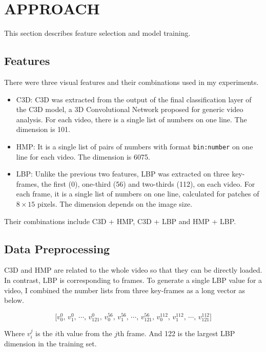 \documentclass[conference, compsoc]{IEEEtran}
\begin{document}
{\section{APPROACH}
This section describes feature selection and model training.

\subsection{Features}
There were three visual features and their combinations used in my experiments.

\begin{itemize}
    \item C3D: C3D was extracted from the output of the final classification layer of the C3D model, a 3D Convolutional Network proposed for generic video analysis.
    For each video, there is a single list of numbers on one line.
    The dimension is 101.

    \item HMP: It is a single list of pairs of numbers with format \verb|bin:number| on one line for each video.
    The dimension is 6075.

    \item LBP: Unlike the previous two features, LBP was extracted on three key-frames, the first (0), one-third (56) and two-thirds (112), on each video.
    For each frame, it is a single list of numbers on one line, calculated for patches of $8 \times 15$ pixels.
    The dimension depends on the image size.
\end{itemize}

Their combinations include C3D + HMP, C3D + LBP and HMP + LBP.

\subsection{Data Preprocessing}
C3D and HMP are related to the whole video so that they can be directly loaded. In contrast, LBP is corresponding to frames.
To generate a single LBP value for a video, I combined the number lists from three key-frames as a long vector as below.

\begin{equation*}
    \bigl[v_{0}^{0},\, v_{1}^{0},\, \cdots,\, v_{121}^{0},\, v_{0}^{56},\, v_{1}^{56},\, \cdots,\, v_{121}^{56},\, v_{0}^{112},\, v_{1}^{112},\, \cdots,\, v_{121}^{112}\bigr]
\end{equation*}

Where $v_{i}^{j}$ is the $i$th value from the $j$th frame. And 122 is the largest LBP dimension in the training set.

}
\end{document}
